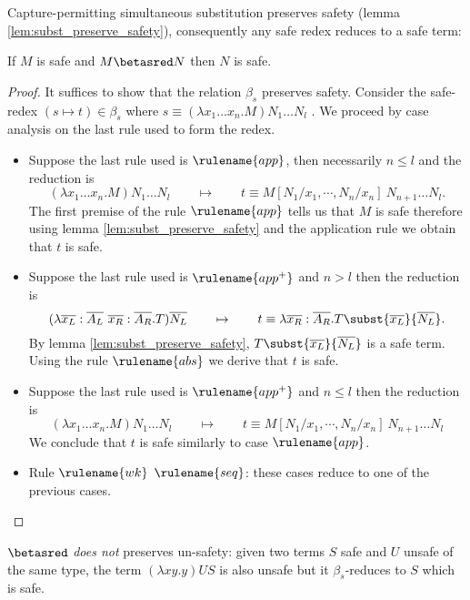 Capture-permitting simultaneous substitution preserves safety (lemma
\ref{lem:subst_preserve_safety}), consequently any safe redex
reduces to a safe term:

\begin{lemma}
\label{lem:homoh_safered_preserve_safety}
If $M$ is safe and $M \betasred N$ then $N$ is safe.
\end{lemma}

\begin{proof}
It suffices to show that the relation $\beta_s$ preserves safety.
Consider the safe-redex $(s\mapsto t) \in \beta_s$ where $ s \equiv (\lambda x_1 \ldots x_n . M) N_1 \ldots N_l $ .
We proceed by case analysis on the last rule used to form the redex.
\begin{itemize}
\item Suppose the last rule used is $\rulename{app}$, then necessarily $n\leq l$ and the reduction is
$$(\lambda x_1 \ldots x_n . M) N_1 \ldots N_l \qquad \mapsto  \qquad t \equiv M[N_1 / x_1 , \cdots, N_n / x_n]\ N_{n+1} \ldots N_l.$$
The first premise of the rule $\rulename{app}$ tells us that $M$ is safe therefore using lemma \ref{lem:subst_preserve_safety} and
the application rule we obtain that $t$ is safe.

\item Suppose the last rule used is $\rulename{app^+}$ and $n> l$ then the reduction is
$$ (\lambda \overline{x_L} : \overline{A_L} \
\overline{x_R}: \overline{A_R} . T) \overline{N_L} \qquad \mapsto
\qquad t \equiv \lambda \overline{x_R}: \overline{A_R} .
T\subst{\overline{x_L}}{\overline{N_L}}.
$$
By lemma \ref{lem:subst_preserve_safety}, $T\subst{\overline{x_L}}{\overline{N_L}}$ is a safe term.
Using the rule $\rulename{abs}$ we derive that $t$ is safe.

\item Suppose the last rule used is $\rulename{app^+}$ and $n\leq l$ then the reduction is
$$(\lambda x_1 \ldots x_n . M) N_1 \ldots N_l \qquad \mapsto \qquad t \equiv M[N_1 / x_1 , \cdots, N_n / x_n]\ N_{n+1} \ldots N_l$$
We conclude that $t$ is safe similarly to case $\rulename{app}$.

\item Rule $\rulename{wk}$ $\rulename{seq}$: these cases reduce to one of the previous cases.
\end{itemize}
\end{proof}


\begin{remark}
\label{rem:betasred_notpreserv_unsafety} $\betasred$ \emph{does not}
preserves un-safety: given two terms $S$ safe and $U$ unsafe of the
same type, the term $(\lambda x y . y) U S$ is also unsafe but it
$\beta_s$-reduces to $S$ which is safe.
\end{remark}


